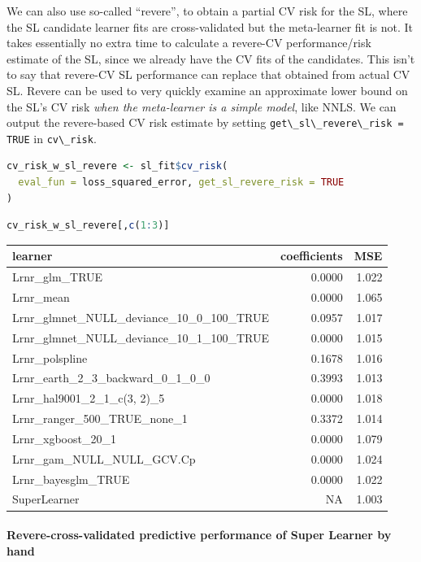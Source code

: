 \documentclass[
  12pt, krantz2,
]{krantz}
\newcommand{\passthrough}[1]{#1}
\newcommand{\1}{\mathbbm{1}}
\theoremstyle{definition}
\theoremstyle{definition}
\theoremstyle{definition}
\theoremstyle{definition}
\theoremstyle{remark}
\begin{document}
We can also use so-called ``revere'', to obtain a partial CV risk for the SL,
where the SL candidate learner fits are cross-validated but the meta-learner fit
is not. It takes essentially no extra time to calculate a revere-CV
performance/risk estimate of the SL, since we already have the CV fits of the
candidates. This isn't to say that revere-CV SL performance can replace that
obtained from actual CV SL. Revere can be used to very quickly examine an
approximate lower bound on the SL's CV risk \emph{when the meta-learner is a simple
model}, like NNLS. We can output the revere-based CV risk estimate by setting
\passthrough{\lstinline!get\_sl\_revere\_risk = TRUE!} in \passthrough{\lstinline!cv\_risk!}.

\begin{lstlisting}[language=R]
cv_risk_w_sl_revere <- sl_fit$cv_risk(
  eval_fun = loss_squared_error, get_sl_revere_risk = TRUE
)
\end{lstlisting}

\begin{lstlisting}[language=R]
cv_risk_w_sl_revere[,c(1:3)]
\end{lstlisting}

\begin{tabular}{l|r|r}
\hline
learner & coefficients & MSE\\
\hline
Lrnr\_glm\_TRUE & 0.0000 & 1.022\\
\hline
Lrnr\_mean & 0.0000 & 1.065\\
\hline
Lrnr\_glmnet\_NULL\_deviance\_10\_0\_100\_TRUE & 0.0957 & 1.017\\
\hline
Lrnr\_glmnet\_NULL\_deviance\_10\_1\_100\_TRUE & 0.0000 & 1.015\\
\hline
Lrnr\_polspline & 0.1678 & 1.016\\
\hline
Lrnr\_earth\_2\_3\_backward\_0\_1\_0\_0 & 0.3993 & 1.013\\
\hline
Lrnr\_hal9001\_2\_1\_c(3, 2)\_5 & 0.0000 & 1.018\\
\hline
Lrnr\_ranger\_500\_TRUE\_none\_1 & 0.3372 & 1.014\\
\hline
Lrnr\_xgboost\_20\_1 & 0.0000 & 1.079\\
\hline
Lrnr\_gam\_NULL\_NULL\_GCV.Cp & 0.0000 & 1.024\\
\hline
Lrnr\_bayesglm\_TRUE & 0.0000 & 1.022\\
\hline
SuperLearner & NA & 1.003\\
\hline
\end{tabular}

\hypertarget{revere-cross-validated-predictive-performance-of-super-learner-by-hand}{%
\paragraph*{Revere-cross-validated predictive performance of Super Learner by hand}\label{revere-cross-validated-predictive-performance-of-super-learner-by-hand}}
\end{document}
